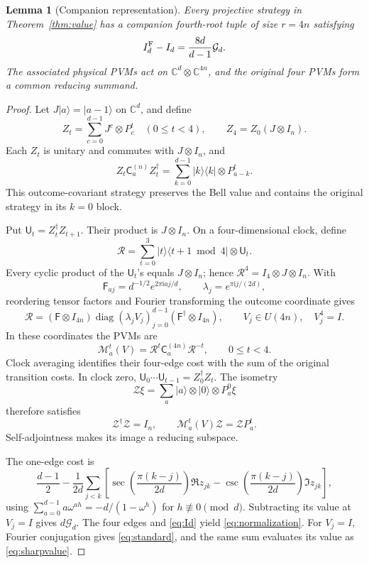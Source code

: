 \documentclass[11pt]{amsart}
\newtheorem{lemma}[theorem]{Lemma}
\theoremstyle{remark}
\theoremstyle{plain}
\numberwithin{equation}{section}
\DeclareMathOperator{\diag}{diag}
\newcommand{\C}{\mathbb C}
\newcommand{\ii}{\mathrm i}
\newcommand{\ket}[1]{\lvert#1\rangle}
\newcommand{\bra}[1]{\langle#1\rvert}
\newcommand{\Gdef}{\mathcal G_d}
\newcommand{\IF}{I_d^{\rm F}}
\newcommand{\Comp}[1]{\mathsf C^{(#1)}}
\newcommand{\RootP}{\mathcal M}
\begin{document}
\begin{lemma}[Companion representation]\label{lem:companion}
Every projective strategy in Theorem~\ref{thm:value} has a companion
fourth-root tuple of size \(r=4n\) satisfying
\begin{equation}\label{eq:normalization}
 \IF-I_d=\frac{8d}{d-1}\Gdef.
\end{equation}
The associated physical PVMs act on \(\C^d\otimes\C^{4n}\), and the
original four PVMs form a common reducing summand.
\end{lemma}

\begin{proof}
Let \(J\ket a=\ket{a-1}\) on \(\C^d\), and define
\[
 Z_t=\sum_{c=0}^{d-1}J^c\otimes P^t_c\quad(0\le t<4),
 \qquad Z_4=Z_0(J\otimes I_n).
\]
Each \(Z_t\) is unitary and commutes with \(J\otimes I_n\), and
\[
 Z_t\Comp n_aZ_t^\dagger
 =\sum_{k=0}^{d-1}\ket k\bra k\otimes P^t_{a-k}.
\]
This outcome-covariant strategy preserves the Bell value and contains
the original strategy in its \(k=0\) block.

Put \(\mathsf U_t=Z_t^\dagger Z_{t+1}\). Their product is
\(J\otimes I_n\). On a four-dimensional clock, define
\[
 \mathcal R=\sum_{t=0}^3
 \ket t\bra{t+1\bmod4}\otimes\mathsf U_t.
\]
Every cyclic product of the \(\mathsf U_t\)'s equals \(J\otimes I_n\);
hence \(\mathcal R^4=I_4\otimes J\otimes I_n\).
With
\[
 \mathsf F_{aj}=d^{-1/2}e^{2\pi\ii aj/d},\qquad
 \lambda_j=e^{\pi\ii j/(2d)},
\]
reordering tensor factors and Fourier transforming the outcome
coordinate gives
\[
 \mathcal R=(\mathsf F\otimes I_{4n})
 \diag(\lambda_jV_j)_{j=0}^{d-1}
 (\mathsf F^\dagger\otimes I_{4n}),
 \qquad V_j\in U(4n),\quad V_j^4=I.
\]
In these coordinates the PVMs are
\begin{equation}\label{eq:rootmeasurements}
 \RootP^t_a(V)=\mathcal R^t\Comp{4n}_a\mathcal R^{-t},
 \qquad 0\le t<4.
\end{equation}
Clock averaging identifies their four-edge cost with the sum of the
original transition costs. In clock zero,
\(\mathsf U_0\cdots\mathsf U_{t-1}=Z_0^\dagger Z_t\).
The isometry
\begin{equation}\label{eq:reducingisometry}
 \mathcal Z\xi=\sum_a\ket a\otimes\ket0\otimes P^0_a\xi
\end{equation}
therefore satisfies
\[
 \mathcal Z^\dagger\mathcal Z=I_n,\qquad
 \RootP^t_a(V)\mathcal Z=\mathcal ZP^t_a.
\]
Self-adjointness makes its image a reducing subspace.

The one-edge cost is
\[
 \frac{d-1}{2}
 -\frac1{2d}\sum_{j<k}
 \left[
 \sec\!\left(\frac{\pi(k-j)}{2d}\right)\Re z_{jk}
 -\csc\!\left(\frac{\pi(k-j)}{2d}\right)\Im z_{jk}
 \right],
\]
using
\(\sum_{a=0}^{d-1}a\omega^{ah}=-d/(1-\omega^h)\) for
\(h\not\equiv0\pmod d\).
Subtracting its value at \(V_j=I\) gives \(d\Gdef\).
The four edges and \eqref{eq:Id} yield \eqref{eq:normalization}.
For \(V_j=I\), Fourier conjugation gives \eqref{eq:standard}, and
the same sum evaluates its value as \eqref{eq:sharpvalue}.
\end{proof}
\end{document}
